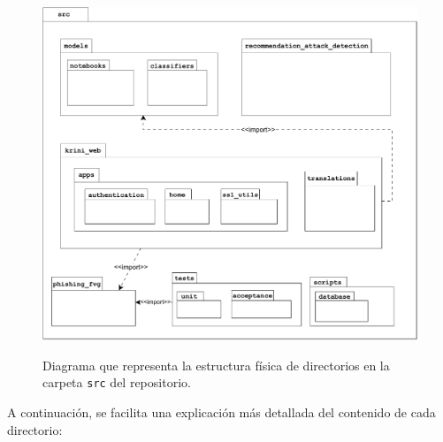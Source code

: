 \begin{figure}[h]
	\caption[Diagrama: estructura de directorios]{Diagrama que representa la estructura física de directorios en la carpeta \texttt{src} del repositorio.}
	\centering
	\includegraphics[width=\textwidth]{../img/anexos/diagrams/repo-structure}
	\label{d:diag-repo-structure}
\end{figure}

A continuación, se facilita una explicación más detallada del contenido de cada directorio:

